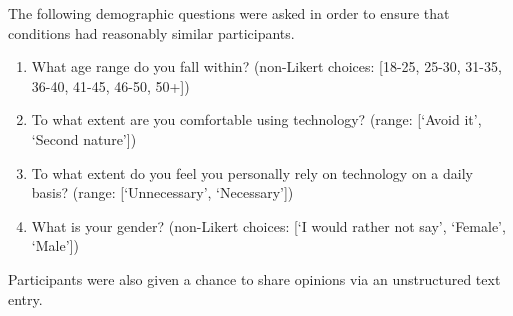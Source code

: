 The following demographic questions were asked in order to ensure that conditions had reasonably similar participants.
\begin{quoting}
\begin{enumerate}[label=\textbf{Demo~\arabic*)}]
    \item What age range do you fall within? (non-Likert choices: [18-25, 25-30, 31-35, 36-40, 41-45, 46-50, 50+])
    \item To what extent are you comfortable using technology? (range: [`Avoid it', `Second nature'])
    \item To what extent do you feel you personally rely on technology on a daily basis? (range: [`Unnecessary', `Necessary'])
    \item What is your gender? (non-Likert choices: [`I would rather not say', `Female', `Male'])
\end{enumerate}
\end{quoting}

Participants were also given a chance to share opinions via an unstructured text entry.

